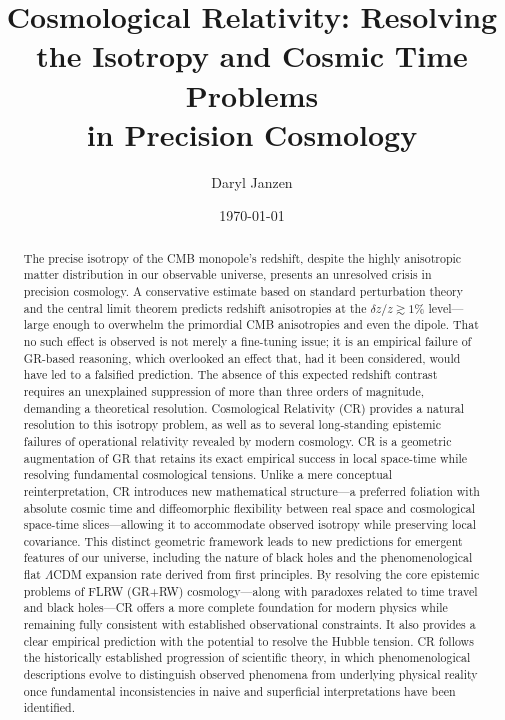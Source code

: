 \documentclass[aps,prd,reprint,superscriptaddress]{revtex4-2}
\begin{document}
\title{Cosmological Relativity: Resolving the Isotropy and Cosmic Time Problems \\in Precision Cosmology}

\author{Daryl Janzen}

\date{\today}

\begin{abstract}
The precise isotropy of the CMB monopole's redshift, despite the highly anisotropic matter distribution in our observable universe, presents an unresolved crisis in precision cosmology. A conservative estimate based on standard perturbation theory and the central limit theorem predicts redshift anisotropies at the $\delta z/z\gtrsim1\%$ level---large enough to overwhelm the primordial CMB anisotropies and even the dipole. That no such effect is observed is not merely a fine-tuning issue; it is an empirical failure of GR-based reasoning, which overlooked an effect that, had it been considered, would have led to a falsified prediction. The absence of this expected redshift contrast requires an unexplained suppression of more than three orders of magnitude, demanding a theoretical resolution. Cosmological Relativity (CR) provides a natural resolution to this isotropy problem, as well as to several long-standing epistemic failures of operational relativity revealed by modern cosmology. CR is a geometric augmentation of GR that retains its exact empirical success in local space-time while resolving fundamental cosmological tensions. Unlike a mere conceptual reinterpretation, CR introduces new mathematical structure---a preferred foliation with absolute cosmic time and diffeomorphic flexibility between real space and cosmological space-time slices---allowing it to accommodate observed isotropy while preserving local covariance. This distinct geometric framework leads to new predictions for emergent features of our universe, including the nature of black holes and the phenomenological flat $\Lambda$CDM expansion rate derived from first principles. By resolving the core epistemic problems of FLRW (GR+RW) cosmology---along with paradoxes related to time travel and black holes---CR offers a more complete foundation for modern physics while remaining fully consistent with established observational constraints. It also provides a clear empirical prediction with the potential to resolve the Hubble tension. CR follows the historically established progression of scientific theory, in which phenomenological descriptions evolve to distinguish observed phenomena from underlying physical reality once fundamental inconsistencies in naive and superficial interpretations have been identified.
\end{abstract}
\end{document}
